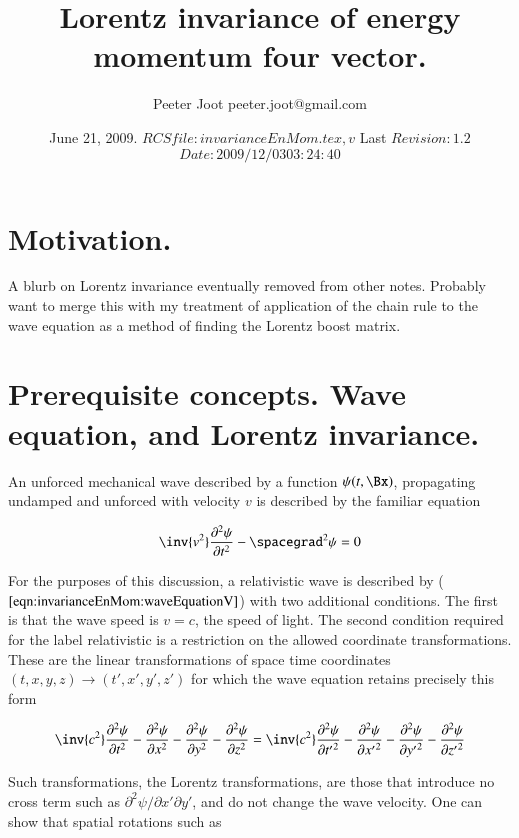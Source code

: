 \documentclass{article}
\title{Lorentz invariance of energy momentum four vector.}
\author{Peeter Joot \quad peeter.joot@gmail.com }
\date{ June 21, 2009.  $RCSfile: invarianceEnMom.tex,v $ Last $Revision: 1.2 $ $Date: 2009/12/03 03:24:40 $ }
\begin{document}
\maketitle{}
\tableofcontents
\section{Motivation.}

A blurb on Lorentz invariance eventually removed from other notes.
Probably want to merge this with my treatment of application of the
chain rule to the wave equation as a method of
finding the Lorentz boost matrix.

\section{Prerequisite concepts.  Wave equation, and Lorentz invariance.}

An unforced mechanical wave described by a function $\psi(t,\Bx)$, propagating undamped and unforced with
velocity $v$ is described by the familiar equation

\begin{align}\label{eqn:invarianceEnMom:waveEquationV}
\inv{v^2} \frac{\partial^2 \psi}{\partial t^2} - \spacegrad^2 \psi = 0
\end{align}

For the purposes of this discussion, a relativistic wave is described by ($\ref{eqn:invarianceEnMom:waveEquationV}$) with two
additional conditions.  The first is that the wave speed is
$v = c$, the speed of light.  The second condition required for the label relativistic 
is a restriction on the allowed coordinate transformations.  These are the linear transformations
of space time coordinates
$(t,x,y,z) \rightarrow (t', x', y', z')$ for which the wave equation retains precisely this form

\begin{align}\label{eqn:invarianceEnMom:waveEquationInv}
\inv{c^2} \frac{\partial^2 \psi}{\partial {t}^2} 
- \frac{\partial^2 \psi}{\partial {x}^2} 
- \frac{\partial^2 \psi}{\partial {y}^2} 
- \frac{\partial^2 \psi}{\partial {z}^2} 
=
\inv{c^2} \frac{\partial^2 \psi}{\partial {t'}^2} 
- \frac{\partial^2 \psi}{\partial {x'}^2} 
- \frac{\partial^2 \psi}{\partial {y'}^2} 
- \frac{\partial^2 \psi}{\partial {z'}^2} 
\end{align}

Such transformations, the Lorentz transformations,
are those that introduce no cross term such as $\partial^2 \psi/\partial x' \partial y'$,
and do not change the wave velocity.  One can show that spatial rotations such as
\end{document}
